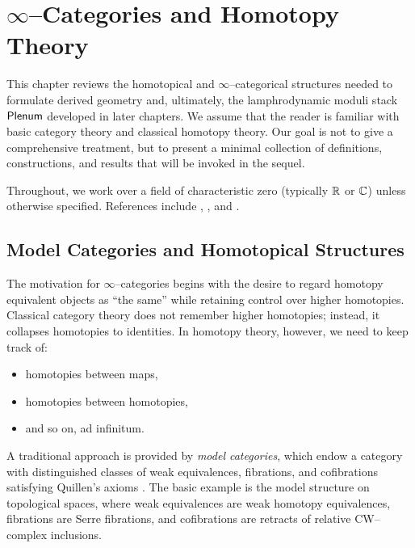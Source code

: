 
\chapter{\texorpdfstring{$\infty$}{Infinity}--Categories and Homotopy Theory}
\label{chap:inf-cat}

This chapter reviews the homotopical and $\infty$--categorical structures
needed to formulate derived geometry and, ultimately, the lamphrodynamic moduli
stack $\mathsf{Plenum}$ developed in later chapters. We assume that the reader is
familiar with basic category theory and classical homotopy theory. Our goal is
not to give a comprehensive treatment, but to present a minimal collection of
definitions, constructions, and results that will be invoked in the sequel.

Throughout, we work over a field of characteristic zero (typically $\mathbb{R}$ or
$\mathbb{C}$) unless otherwise specified. References include \cite{Lurie2009HTT},
\cite{Lurie2017HA}, and \cite{ToenVezzosi2008}.

\section{Model Categories and Homotopical Structures}

The motivation for $\infty$--categories begins with the desire to regard
homotopy equivalent objects as ``the same'' while retaining control over
higher homotopies. Classical category theory does not remember higher
homotopies; instead, it collapses homotopies to identities. In homotopy
theory, however, we need to keep track of:
\begin{itemize}
  \item homotopies between maps,
  \item homotopies between homotopies,
  \item and so on, ad infinitum.
\end{itemize}

A traditional approach is provided by \emph{model categories}, which endow a
category with distinguished classes of weak equivalences, fibrations, and
cofibrations satisfying Quillen's axioms \cite{Quillen1967}. The basic example
is the model structure on topological spaces, where weak equivalences are
weak homotopy equivalences, fibrations are Serre fibrations, and cofibrations
are retracts of relative CW--complex inclusions.

